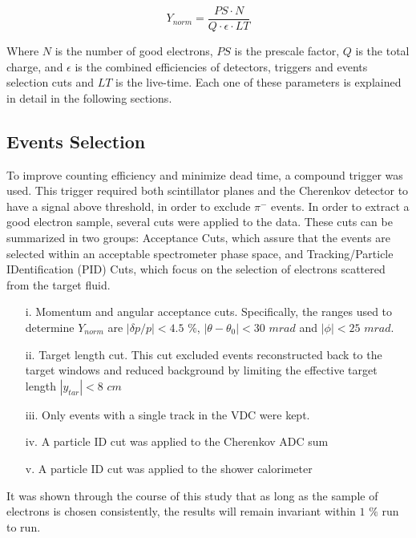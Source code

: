 \documentclass[final,5p,times,twocolumn]{elsarticle}
\begin{document}
\begin{equation}
Y_{norm} = \frac{PS \cdot N}{ Q \cdot \epsilon \cdot LT }
\label{eq:yield}
\end{equation}

\noindent Where $N$ is the number of good electrons, $PS$ is the prescale factor, $Q$ is the total charge, and $\epsilon $ is the combined efficiencies of detectors, triggers and events selection cuts and $LT$ is the live-time. Each one of these parameters is explained in detail in the following sections.

\subsection{Events Selection}
To improve counting efficiency and minimize dead time, a compound trigger was used. This trigger required both scintillator planes and the Cherenkov detector to have a signal above threshold, in order to exclude $\pi^{-}$ events. In order to extract a good electron sample, several cuts were applied to the data. These cuts can be summarized in two groups: Acceptance Cuts, which assure that the events are selected within an acceptable spectrometer phase space, and Tracking/Particle IDentification (PID) Cuts, which focus on the selection of electrons scattered from the target fluid.

\begin{itemize}
\item[i.] Momentum and angular acceptance cuts. Specifically, the ranges used to determine $Y_{norm}$ are $|\delta p/p| < 4.5$ $\%$,  $|\theta-\theta_{0}| < 30 $ $mrad  $ and $|\phi| < 25$ $mrad$.

\item[ii.] Target length cut. This cut excluded events reconstructed back to the target windows and reduced background by limiting the effective target length $|y_{tar}|<8$ $cm$ 

\item[iii.] Only events with a single track in the VDC were kept.

\item[iv.] A particle ID cut was applied to the Cherenkov ADC sum

\item[v.] A particle ID cut was applied to the shower calorimeter

\end{itemize}

It was shown through the course of this study that as long as the sample of electrons is chosen consistently, the results will remain invariant within $1$ $\%$ run to run.
\end{document}

